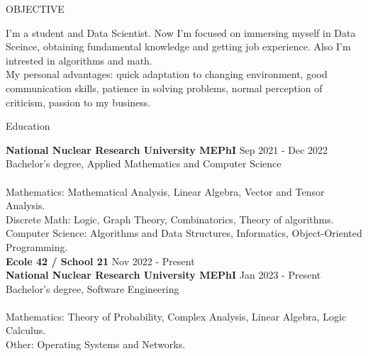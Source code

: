 \documentclass{resume} %
\begin{document}

\begin{rSection}{OBJECTIVE}

I'm a student and Data Scientist. Now I'm focused on immersing myself in Data Sceince, obtaining fundamental knowledge and getting job experience. Also I'm intrested in algorithms and math. \\
My personal advantages: quick adaptation to changing environment, good communication skills, patience in solving problems, normal perception of criticism, passion to my business.


\end{rSection}

\begin{rSection}{Education}

{\textbf{National Nuclear Research University MEPhI}} \hfill { Sep 2021 - Dec 2022}
\\ 
Bachelor's degree, Applied Mathematics and Computer Science\\ \\ 
Mathematics: Mathematical Analysis, Linear Algebra, Vector and Tensor Analysis. \\ 
Discrete Math: Logic, Graph Theory, Combinatorics, Theory of algorithms. \\
Computer Science: Algorithms and Data Structures, Informatics, Object-Oriented Programming. \\

{\bf Ecole 42 / School 21} \hfill { Nov 2022 - Present} \\ 

{\bf National Nuclear Research University MEPhI} \hfill { Jan 2023 - Present}
\\ 
Bachelor's degree, Software Engineering\\ \\ 
Mathematics: Theory of Probability, Complex Analysis, Linear Algebra, Logic Calculus. \\
Other: Operating Systems and Networks. \\







\end{rSection}
\end{document}
